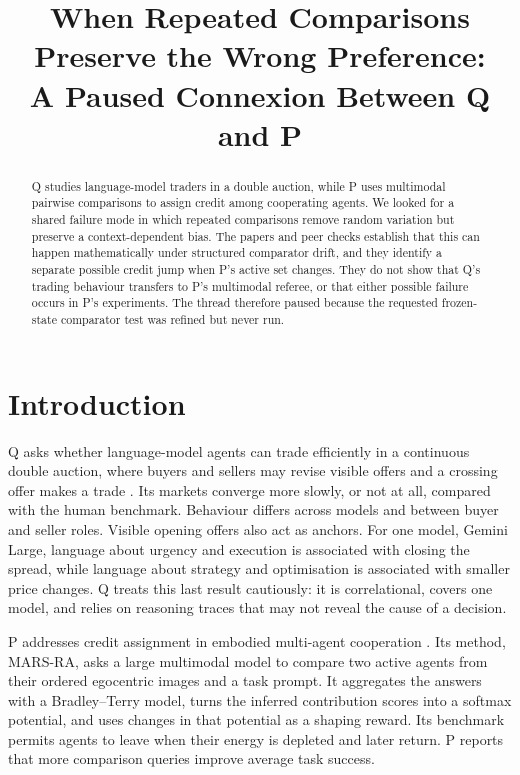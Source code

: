 \documentclass{article}
\title{When Repeated Comparisons Preserve the Wrong Preference:\\A Paused Connexion Between Q and P}
\author{}
\date{}
\begin{document}
\maketitle

\begin{abstract}
Q studies language-model traders in a double auction, while P uses multimodal pairwise comparisons to assign credit among cooperating agents.  We looked for a shared failure mode in which repeated comparisons remove random variation but preserve a context-dependent bias.  The papers and peer checks establish that this can happen mathematically under structured comparator drift, and they identify a separate possible credit jump when P's active set changes.  They do not show that Q's trading behaviour transfers to P's multimodal referee, or that either possible failure occurs in P's experiments.  The thread therefore paused because the requested frozen-state comparator test was refined but never run.
\end{abstract}

\section{Introduction}

Q asks whether language-model agents can trade efficiently in a continuous double auction, where buyers and sellers may revise visible offers and a crossing offer makes a trade \cite{struski2026market}.  Its markets converge more slowly, or not at all, compared with the human benchmark.  Behaviour differs across models and between buyer and seller roles.  Visible opening offers also act as anchors.  For one model, Gemini Large, language about urgency and execution is associated with closing the spread, while language about strategy and optimisation is associated with smaller price changes.  Q treats this last result cautiously: it is correlational, covers one model, and relies on reasoning traces that may not reveal the cause of a decision.

P addresses credit assignment in embodied multi-agent cooperation \cite{wang2026mars}.  Its method, MARS-RA, asks a large multimodal model to compare two active agents from their ordered egocentric images and a task prompt.  It aggregates the answers with a Bradley--Terry model, turns the inferred contribution scores into a softmax potential, and uses changes in that potential as a shaping reward.  Its benchmark permits agents to leave when their energy is depleted and later return.  P reports that more comparison queries improve average task success.
\end{document}
